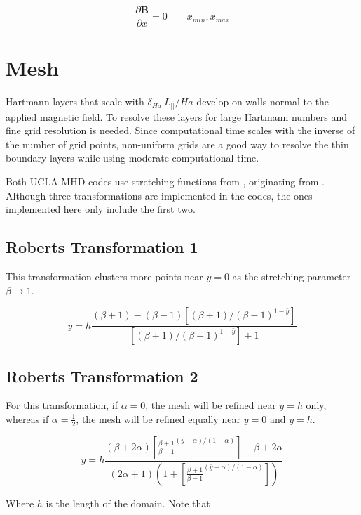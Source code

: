\documentclass[11pt]{article}
\begin{document}
\begin{equation}
	\frac{\partial \pmb{B}}{\partial x} = 0
	\qquad
	x_{min},x_{max}
\end{equation}

\section{Mesh}
Hartmann layers that scale with $\delta_{Ha}~L_{||}/Ha$ develop on walls normal to the applied magnetic field. To resolve these layers for large Hartmann numbers and fine grid resolution is needed. Since computational time scales with the inverse of the number of grid points, non-uniform grids are a good way to resolve the thin boundary layers while using moderate computational time.

Both UCLA MHD codes use stretching functions from \cite{pletcher2012computational}, originating from \cite{Roberts1971}. Although three transformations are implemented in the codes, the ones implemented here only include the first two.

\subsection{Roberts Transformation 1}

This transformation clusters more points near $y=0$ as the stretching parameter $\beta \rightarrow 1$.

\begin{equation}
	y
	=
	h
	\frac{(\beta+1)-(\beta-1) \left[ (\beta+1)/(\beta-1)^{1-\bar{y}} \right] }
	{\left[ (\beta+1)/(\beta-1)^{1-\bar{y}} \right]+1}
\end{equation}

\subsection{Roberts Transformation 2}
For this transformation, if $\alpha=0$, the mesh will be refined near $y=h$ only, whereas if $\alpha= \frac{1}{2}$, the mesh will be refined equally near $y=0$ and $y=h$.

\begin{equation}
	y 
	= 
	h 
	\frac{
	(\beta + 2 \alpha)
	\left[ \frac{\beta+1}{\beta-1}^{(\bar{y}-\alpha)/(1-\alpha)} \right] - \beta + 2 \alpha}
	{
	(2\alpha+1)
	\left(1+\left[ \frac{\beta+1}{\beta-1}^{(\bar{y}-\alpha)/(1-\alpha)} \right]
	\right)
	}
\end{equation}

Where $h$ is the length of the domain. Note that
\end{document}
